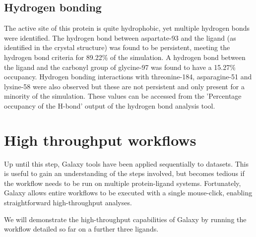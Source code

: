 \documentclass[twocolumn]{bmcart}%
\begin{document}
\subsection*{Hydrogen bonding}
The active site of this protein is quite hydrophobic, yet multiple hydrogen bonds were identified. The hydrogen bond between aspartate-93 and the ligand (as identified in the crystal structure) was found to be persistent, meeting the hydrogen bond criteria for 89.22\% of the simulation. A hydrogen bond between the ligand and the carbonyl group of glycine-97 was found to have a 15.27\% occupancy. Hydrogen bonding interactions with threonine-184, asparagine-51 and lysine-58 were also observed but these are not persistent and only present for a minority of the simulation. These values can be accessed from the 'Percentage occupancy of the H-bond' output of the hydrogen bond analysis tool. 

\hypertarget{optional-automating-high-throughput-calculations}{%
\section*{High throughput workflows}\label{optional-automating-high-throughput-calculations}}

Up until this step, Galaxy tools have been applied sequentially to datasets. This is useful to gain an understanding of the steps involved, but becomes tedious if the workflow needs to be run on multiple protein-ligand systems. Fortunately, Galaxy allows entire workflows to be executed with a single mouse-click, enabling straightforward high-throughput analyses.

We will demonstrate the high-throughput capabilities of Galaxy by running the workflow detailed so far on a further three ligands.
\end{document}
